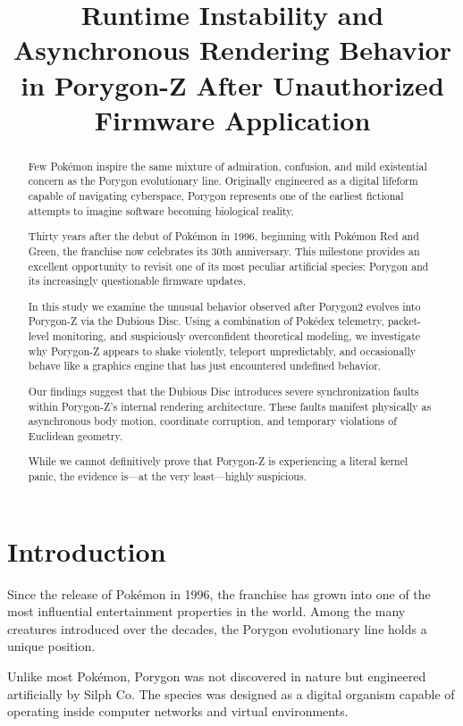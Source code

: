 \documentclass[conference]{IEEEtran}
\title{Runtime Instability and Asynchronous Rendering Behavior in Porygon-Z After Unauthorized Firmware Application}
\author{
\IEEEauthorblockN{Chaehojun Jeong}
\IEEEauthorblockA{
Chung-Ang University, Seoul, Korea
}
}
\begin{document}
\maketitle

\begin{abstract}

Few Pokémon inspire the same mixture of admiration, confusion, and mild existential concern as the Porygon evolutionary line. Originally engineered as a digital lifeform capable of navigating cyberspace, Porygon represents one of the earliest fictional attempts to imagine software becoming biological reality.

Thirty years after the debut of Pokémon in 1996, beginning with Pokémon Red and Green, the franchise now celebrates its 30th anniversary. This milestone provides an excellent opportunity to revisit one of its most peculiar artificial species: Porygon and its increasingly questionable firmware updates.

In this study we examine the unusual behavior observed after Porygon2 evolves into Porygon-Z via the Dubious Disc. Using a combination of Pokédex telemetry, packet-level monitoring, and suspiciously overconfident theoretical modeling, we investigate why Porygon-Z appears to shake violently, teleport unpredictably, and occasionally behave like a graphics engine that has just encountered undefined behavior.

Our findings suggest that the Dubious Disc introduces severe synchronization faults within Porygon-Z's internal rendering architecture. These faults manifest physically as asynchronous body motion, coordinate corruption, and temporary violations of Euclidean geometry.

While we cannot definitively prove that Porygon-Z is experiencing a literal kernel panic, the evidence is—at the very least—highly suspicious.

\end{abstract}

\section{Introduction}

Since the release of Pokémon in 1996, the franchise has grown into one of the most influential entertainment properties in the world. Among the many creatures introduced over the decades, the Porygon evolutionary line holds a unique position.

Unlike most Pokémon, Porygon was not discovered in nature but engineered artificially by Silph Co. The species was designed as a digital organism capable of operating inside computer networks and virtual environments.
\end{document}
